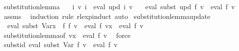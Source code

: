 \begin{isabellebody}
\isadelimdocument
%
\endisadelimdocument
%
\isatagdocument
%
\isamarkuptrue%
%
\endisatagdocument
{\isafolddocument}%
%
\isadelimdocument
%
\endisadelimdocument
{}\isamarkupfalse%
\ substitution{\isacharunderscore}{\kern0pt}lemma{\isacharcolon}{\kern0pt}\isanewline
\ \ \ {\isachardoublequoteopen}{\isasymforall}i{\isachardot}{\kern0pt}\ v{\isacharprime}{\kern0pt}\ i\ {\isacharequal}{\kern0pt}\ eval\ {\isacharparenleft}{\kern0pt}upd\ i{\isacharparenright}{\kern0pt}\ v{\isachardoublequoteclose}\isanewline
\ \ \ {\isachardoublequoteopen}eval\ {\isacharparenleft}{\kern0pt}subst\ upd\ f{\isacharparenright}{\kern0pt}\ v\ {\isacharequal}{\kern0pt}\ eval\ f\ v{\isacharprime}{\kern0pt}{\isachardoublequoteclose}\isanewline
%
\isadelimproof
\ \ %
\endisadelimproof
%
\isatagproof
{}\isamarkupfalse%
\ assms\ \isamarkupfalse%
\ {\isacharparenleft}{\kern0pt}induction\ rule{\isacharcolon}{\kern0pt}\ rlexp{\isachardot}{\kern0pt}induct{\isacharparenright}{\kern0pt}\ auto%
\endisatagproof
{\isafoldproof}%
%
\isadelimproof
\isanewline
%
\endisadelimproof
\isanewline
{}\isamarkupfalse%
\ substitution{\isacharunderscore}{\kern0pt}lemma{\isacharunderscore}{\kern0pt}update{\isacharcolon}{\kern0pt}\isanewline
\ \ {\isachardoublequoteopen}eval\ {\isacharparenleft}{\kern0pt}subst\ {\isacharparenleft}{\kern0pt}Var{\isacharparenleft}{\kern0pt}x\ {\isacharcolon}{\kern0pt}{\isacharequal}{\kern0pt}\ f{\isacharprime}{\kern0pt}{\isacharparenright}{\kern0pt}{\isacharparenright}{\kern0pt}\ f{\isacharparenright}{\kern0pt}\ v\ {\isacharequal}{\kern0pt}\ eval\ f\ {\isacharparenleft}{\kern0pt}v{\isacharparenleft}{\kern0pt}x\ {\isacharcolon}{\kern0pt}{\isacharequal}{\kern0pt}\ eval\ f{\isacharprime}{\kern0pt}\ v{\isacharparenright}{\kern0pt}{\isacharparenright}{\kern0pt}{\isachardoublequoteclose}\isanewline
%
\isadelimproof
\ \ %
\endisadelimproof
%
\isatagproof
{}\isamarkupfalse%
\ substitution{\isacharunderscore}{\kern0pt}lemma{\isacharbrackleft}{\kern0pt}of\ {\isachardoublequoteopen}v{\isacharparenleft}{\kern0pt}x\ {\isacharcolon}{\kern0pt}{\isacharequal}{\kern0pt}\ eval\ f{\isacharprime}{\kern0pt}\ v{\isacharparenright}{\kern0pt}{\isachardoublequoteclose}{\isacharbrackright}{\kern0pt}\ \isamarkupfalse%
\ force%
\endisatagproof
{\isafoldproof}%
%
\isadelimproof
\isanewline
%
\endisadelimproof
\isanewline
{}\isamarkupfalse%
\ subst{\isacharunderscore}{\kern0pt}id{\isacharcolon}{\kern0pt}\ {\isachardoublequoteopen}eval\ {\isacharparenleft}{\kern0pt}subst\ Var\ f{\isacharparenright}{\kern0pt}\ v\ {\isacharequal}{\kern0pt}\ eval\ f\ v{\isachardoublequoteclose}\isanewline

\end{isabellebody}
